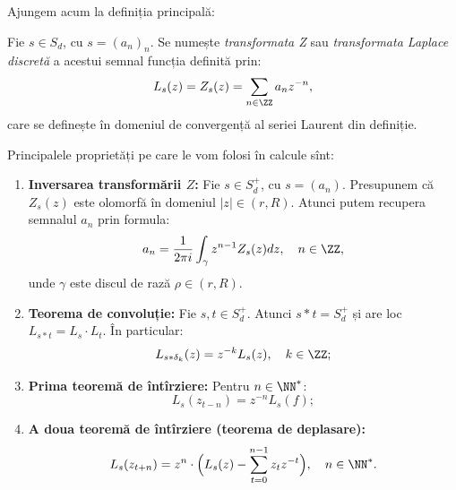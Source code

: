 Ajungem acum la definiția principală:
\begin{definition}\label{def:z}
  Fie $ s \in S_d $, cu $ s = (a_n)_n $. Se numește \emph{transformata Z} sau
  \emph{transformata Laplace discretă} a acestui semnal funcția definită prin:
  \[
    L_s(z) = Z_s(z) = \sum_{n \in \ZZ} a_n z^{-n},
  \]
  care se definește în domeniul de convergență al seriei Laurent din definiție.
\end{definition}

Principalele proprietăți pe care le vom folosi în calcule sînt:
\begin{enumerate}[(1)]
\item \textbf{Inversarea transformării $ Z $:} Fie $ s \in S_d^+ $, cu $ s = (a_n) $.
  Presupunem că $ Z_s(z) $ este olomorfă în domeniul $ |z| \in (r, R) $. Atunci
  putem recupera semnalul $ a_n $ prin formula:
  \[
    a_n = \dfrac{1}{2 \pi i} \int_{\gamma} z^{n-1} Z_s(z) dz, \quad n \in \ZZ,
  \]
  unde $ \gamma $ este discul de rază $ \rho \in (r, R) $.
\item \textbf{Teorema de convoluție:} Fie $ s, t \in S_d^+ $. Atunci $ s \ast t = S_d^+ $
  și are loc $ L_{s \ast t} = L_s \cdot L_t $. În particular:
  \[
    L_{s \ast \delta_k}(z) = z^{-k} L_s(z), \quad k \in \ZZ;
  \]
\item \textbf{Prima teoremă de întîrziere:} Pentru $ n\in \NN^\ast $:
  \[
    L_s( z_{t - n}) = z^{-n} L_s(f);
  \]
\item \textbf{A doua teoremă de întîrziere (teorema de deplasare):}
  \[
    L_s(z_{t + n}) = z^n \cdot \Big( L_s(z) - \sum_{t = 0}^{n-1} z_t z^{-t} \Big), \quad n \in \NN^\ast.
  \]
\end{enumerate}

